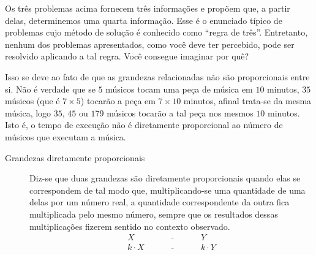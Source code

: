 Os três problemas acima fornecem três informações e propõem que, a partir delas, determinemos uma quarta informação. Esse é o enunciado típico de problemas cujo método de solução é conhecido como “regra de três”. Entretanto, nenhum dos problemas apresentados, como você deve ter percebido, pode ser resolvido aplicando a tal regra. Você consegue imaginar por quê?

Isso se deve ao fato de que as grandezas relacionadas não são proporcionais entre si. Não é verdade que se \(5\) músicos tocam uma peça de música em \(10\) minutos, \(35\) músicos (que é \(7 \times 5\)) tocarão a peça em \(7 \times 10\) minutos, afinal trata-se da mesma música, logo \(35\), \(45\) ou \(179\) músicos tocarão a tal peça nos mesmos \(10\) minutos. Isto é, o tempo de execução não é diretamente proporcional ao número de músicos que executam a música.
\begin{description}
\item[{Grandezas diretamente proporcionais}] \leavevmode{}\label{\detokenize{AF107-0:term-grandezas-diretamente-proporcionais}}
Diz-se que duas grandezas são diretamente proporcionais quando elas se correspondem de tal modo que, multiplicando-se uma quantidade de uma delas por um número real, a quantidade correspondente da outra fica multiplicada pelo mesmo número, sempre que os resultados dessas multiplicações fizerem sentido no contexto observado.
\[\begin{array}{ccc}
X\quad &\overline{\quad \quad \quad}& \quad Y \\
k\cdot X \quad &\overline{\quad \quad \quad}& \quad k\cdot Y
\end{array}\]
\end{description}

